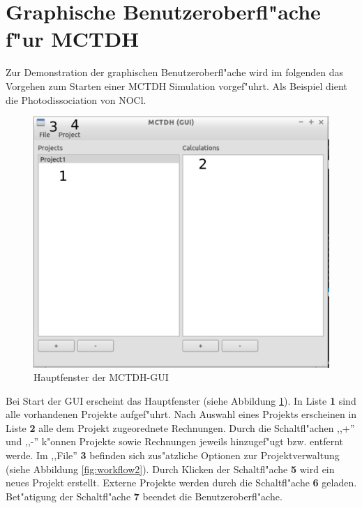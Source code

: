 \section{Graphische Benutzeroberfl"ache f"ur MCTDH}

Zur Demonstration der graphischen Benutzeroberfl"ache wird im folgenden das Vorgehen zum Starten einer 
MCTDH Simulation vorgef"uhrt. Als Beispiel dient die Photodissociation von NOCl.

\begin{figure}
    \centering
    \includegraphics[scale=0.5]{figures/screenMain}
    \caption{Hauptfenster der MCTDH-GUI}\label{fig:workflow1}
\end{figure}

Bei Start der GUI erscheint das Hauptfenster (siehe Abbildung \ref{fig:workflow1}).
In Liste \textbf{1} sind alle vorhandenen Projekte aufgef"uhrt.
Nach Auswahl eines Projekts erscheinen in Liste \textbf{2} alle dem Projekt zugeorednete Rechnungen.
Durch die Schaltfl"achen ,,+'' und ,,-'' k"onnen Projekte sowie Rechnungen jeweils hinzugef"ugt bzw.
entfernt werde.
Im ,,File'' \textbf{3} befinden sich zus"atzliche Optionen zur Projektverwaltung (siehe Abbildung \ref{fig:workflow2}).
Durch Klicken der Schaltfl"ache \textbf{5} wird ein neues Projekt erstellt. Externe Projekte werden durch die 
Schaltfl"ache \textbf{6} geladen. Bet"atigung der Schaltfl"ache \textbf{7} beendet die Benutzeroberfl"ache.

